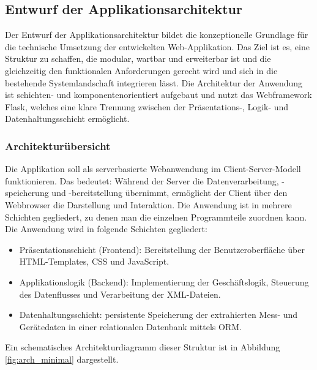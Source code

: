 \subsection{Entwurf der Applikationsarchitektur}
\label{subsec:entwurf-der-applikationsarchitektur}


Der Entwurf der Applikationsarchitektur bildet die konzeptionelle Grundlage für die technische Umsetzung der entwickelten Web-Applikation.
Das Ziel ist es, eine Struktur zu schaffen, die modular, wartbar und erweiterbar ist und die gleichzeitig den funktionalen Anforderungen gerecht wird und sich in die bestehende Systemlandschaft integrieren lässt.
Die Architektur der Anwendung ist schichten- und komponentenorientiert aufgebaut und nutzt das Webframework Flask, welches eine klare Trennung zwischen der Präsentations-, Logik- und Datenhaltungsschicht ermöglicht.


\subsubsection{Architekturübersicht}
\label{subsubsec:arch}
Die Applikation soll als serverbasierte Webanwendung im Client-Server-Modell funktionieren.
Das bedeutet: Während der Server die Datenverarbeitung, -speicherung und -bereitstellung übernimmt, ermöglicht der Client über den Webbrowser die Darstellung und Interaktion.
Die Anwendung ist in mehrere Schichten gegliedert, zu denen man die einzelnen Programmteile zuordnen kann.
Die Anwendung wird in folgende Schichten gegliedert:

\begin{itemize}
\item Präsentationsschicht (Frontend): Bereitstellung der Benutzeroberfläche über HTML-Templates, \ac{CSS} und JavaScript.

\item
Applikationslogik (Backend): Implementierung der Geschäftslogik, Steuerung des Datenflusses und Verarbeitung der XML-Dateien.

\item
Datenhaltungsschicht: persistente Speicherung der extrahierten Mess- und Gerätedaten in einer relationalen Datenbank mittels ORM.

\end{itemize}

Ein schematisches Architekturdiagramm dieser Struktur ist in Abbildung \ref{fig:arch_minimal} dargestellt.

